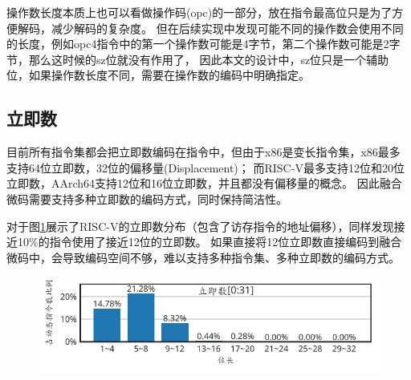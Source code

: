 操作数长度本质上也可以看做操作码(opc)的一部分，放在指令最高位只是为了方便解码，减少解码的复杂度。
但在后续实现中发现可能不同的操作数会使用不同的长度，例如opc4指令中的第一个操作数可能是4字节，第二个操作数可能是2字节，那么这时候的sz位就没有作用了，
因此本文的设计中，sz位只是一个辅助位，如果操作数长度不同，需要在操作数的编码中明确指定。

\subsection{立即数}

目前所有指令集都会把立即数编码在指令中，但由于x86是变长指令集，x86最多支持64位立即数，32位的偏移量(Displacement)；
而RISC-V最多支持12位和20位立即数，AArch64支持12位和16位立即数，并且都没有偏移量的概念。
因此融合微码需要支持多种立即数的编码方式，同时保持简洁性。

对于图\ref{img:immsize_riscv}展示了RISC-V的立即数分布（包含了访存指令的地址偏移），同样发现接近10\%的指令使用了接近12位的立即数。
如果直接将12位立即数直接编码到融合微码中，会导致编码空间不够，难以支持多种指令集、多种立即数的编码方式。


\begin{figure}[h]
  \centering
  \includegraphics[width=0.8\linewidth]{./plot_pdf/immsize_riscv.pdf}
  \label{img:immsize_riscv}
\end{figure}

